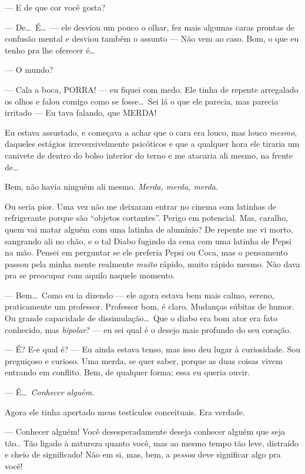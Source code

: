 --- E de que cor você gosta?

--- De\ldots \ É\ldots \ --- ele desviou um pouco o olhar, fez mais algumas caras prontas de confusão mental e desviou também o assunto --- Não vem ao caso. Bom, o que eu tenho pra lhe oferecer é\ldots

--- O mundo?

--- Cala a boca, PORRA! --- eu fiquei com medo. Ele tinha de repente arregalado os olhos e falou comigo como se fosse\ldots \ Sei lá o que ele parecia, mas parecia irritado --- Eu tava falando, que MERDA!

Eu estava assustado, e começava a achar que o cara era louco, mas louco \emph{mesmo}, daqueles estágios irreversivelmente psicóticos e que a qualquer hora ele tiraria um canivete de dentro do bolso interior do terno e me atacaria ali mesmo, na frente de\ldots

Bem, não havia ninguém ali mesmo. \emph{Merda, merda, merda}.

Ou seria pior. Uma vez não me deixaram entrar no cinema com latinhas de refrigerante porque são ``objetos cortantes''. Perigo em potencial. Mas, caralho, quem vai matar alguém com uma latinha de alumínio? De repente me vi morto, sangrando ali no chão, e o tal Diabo fugindo da cena com uma latinha de Pepsi na mão. Pensei em perguntar se ele preferia Pepsi ou Coca, mas o pensamento passou pela minha mente realmente \emph{muito} rápido, muito rápido mesmo. Não dava pra se preocupar com aquilo naquele momento.

--- Bem\ldots \ Como eu ia dizendo --- ele agora estava bem mais calmo, sereno, praticamente um professor. Professor bom, é claro. Mudanças súbitas de humor. Ou grande capacidade de dissimulação\ldots \ Que o diabo era bom ator era fato conhecido, mas \emph{bipolar}? --- eu sei qual é o desejo mais profundo do seu coração.

--- É? E-e qual é? --- Eu ainda estava tenso, mas isso deu lugar à curiosidade. Sou preguiçoso e curioso. Uma merda, se quer saber, porque as duas coisas vivem entrando em conflito. Bem, de qualquer forma: essa eu queria ouvir.

--- É\ldots \ \emph{Conhecer alguém}.

Agora ele tinha apertado meus testículos conceituais. Era verdade.

--- Conhecer alguém! Você desesperadamente deseja conhecer alguém que seja tão.. Tão ligado à natureza quanto você, mas ao mesmo tempo tão leve, distraído e cheio de significado! Não em si, mas, bem, a \emph{pessoa} deve significar algo pra você!

